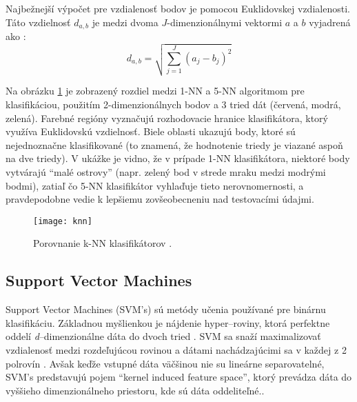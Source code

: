 Najbežnejší výpočet pre vzdialenosť bodov je pomocou Euklidovskej vzdialenosti.
Táto vzdielnosť $d_{a,b}$ je medzi dvoma $J$-dimenzionálnymi vektormi $a$ a $b$ vyjadrená ako \cite{prop:KnnClassification}:
\begin{equation}
    \label{eq:euclidMetric}
    d_{a,b} = \sqrt{\sum_{j=1}^{J}{(a_j - b_j)^2}}
\end{equation}

Na obrázku \ref{pic:kNN} je zobrazený rozdiel medzi 1-NN a 5-NN algoritmom pre klasifikáciou,
    použitím 2-dimenzionálnych bodov a 3 tried dát (červená, modrá, zelená).
Farebné regióny vyznačujú rozhodovacie hranice klasifikátora, ktorý využíva Euklidovskú vzdielnosť.
Biele oblasti ukazujú body, ktoré sú nejednoznačne klasifikované (to znamená, že hodnotenie triedy je viazané aspoň na dve triedy).
V ukážke je vidno, že v prípade 1-NN klasifikátora, niektoré body vytvárajú ``malé ostrovy''
    (napr. zelený bod v strede mraku medzi modrými bodmi), zatiaľ čo 5-NN klasifikátor vyhlaďuje tieto nerovnomernosti,
    a pravdepodobne vedie k lepšiemu zovšeobecneniu nad testovacími údajmi.

\begin{figure}[H]
	\centering
	\texttt{[image: knn]}
	\caption{Porovnanie k-NN klasifikátorov \cite{odkaz:KnnImage}.}
	\label{pic:kNN}
\end{figure}



\subsection{Support Vector Machines}
Support Vector Machines (SVM's) sú metódy učenia používané pre binárnu klasifikáciu.
Základnou myšlienkou je nájdenie hyper--roviny, ktorá perfektne oddelí \textit{d}--dimenzionálne dáta do dvoch tried \cite{prop:IntroductionToSVM}.
SVM sa snaží maximalizovať vzdialenosť medzi rozdeľujúcou rovinou a dátami nachádzajúcimi sa v každej z 2 polrovín \cite{prop:SupervisedMachineLearning}.
Avšak keďže vstupné dáta väčšinou nie su lineárne separovatelné, SVM's predstavujú pojem “kernel induced feature space”,
    ktorý prevádza dáta do vyššieho dimenzionálneho priestoru, kde sú dáta oddeliteľné.\cite{prop:IntroductionToSVM}.

